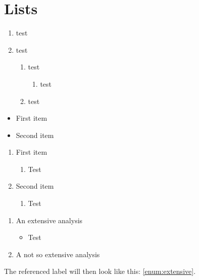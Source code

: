 \documentclass[10pt, a4paper]{article}
\begin{document}
\section{Lists}
\blindtext

\begin{enumerate}
  \item test
  \item test
  \begin{enumerate}
    \item test
    \begin{enumerate}
      \item test
    \end{enumerate}
    \item test
  \end{enumerate}
\end{enumerate}

\blindtext

\begin{itemize}
  \item First item
  \item[\ding{43}] Second item
\end{itemize}


\begin{enumerate}
  \item First item
  \begin{enumerate}
    \item Test
  \end{enumerate}
  \item Second item
  \begin{enumerate}
    \item Test
  \end{enumerate}
\end{enumerate}

\begin{enumerate}[label=\Roman*),ref=\emph{\Roman*}] %
  \item  An extensive analysis \label{enum:extensive} %
   \begin{itemize}
     \item Test
   \end{itemize}
 \item A not so extensive analysis
\end{enumerate}

The referenced label will then look like this: \ref{enum:extensive}.
\end{document}
